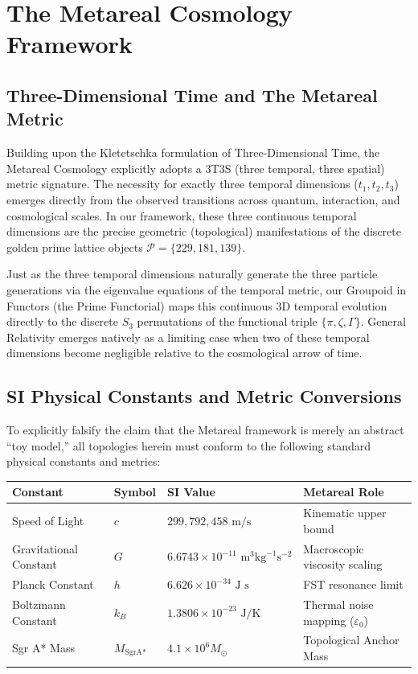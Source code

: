 \section{The Metareal Cosmology Framework}

\subsection*{Three-Dimensional Time and The Metareal Metric}
Building upon the Kletetschka formulation of Three-Dimensional Time, the Metareal Cosmology explicitly adopts a 3T3S (three temporal, three spatial) metric signature. The necessity for exactly three temporal dimensions ($t_1, t_2, t_3$) emerges directly from the observed transitions across quantum, interaction, and cosmological scales. In our framework, these three continuous temporal dimensions are the precise geometric (topological) manifestations of the discrete golden prime lattice objects $\mathcal{P} = \{229, 181, 139\}$. 

Just as the three temporal dimensions naturally generate the three particle generations via the eigenvalue equations of the temporal metric, our Groupoid in Functors (the Prime Functorial) maps this continuous 3D temporal evolution directly to the discrete $S_3$ permutations of the functional triple $\{\pi, \zeta, \Gamma\}$. General Relativity emerges natively as a limiting case when two of these temporal dimensions become negligible relative to the cosmological arrow of time.

\subsection*{SI Physical Constants and Metric Conversions}
To explicitly falsify the claim that the Metareal framework is merely an abstract ``toy model,'' all topologies herein must conform to the following standard physical constants and metrics:
\begin{table}[ht]
\centering
\renewcommand{\arraystretch}{1.2}
\begin{tabular}{@{}llll@{}}
\toprule
\textbf{Constant} & \textbf{Symbol} & \textbf{SI Value} & \textbf{Metareal Role} \\
\midrule
Speed of Light & $c$ & $299,792,458 \text{ m/s}$ & Kinematic upper bound \\
Gravitational Constant & $G$ & $6.6743 \times 10^{-11} \text{ m}^3 \text{kg}^{-1} \text{s}^{-2}$ & Macroscopic viscosity scaling \\
Planck Constant & $h$ & $6.626 \times 10^{-34} \text{ J s}$ & FST resonance limit \\
Boltzmann Constant & $k_B$ & $1.3806 \times 10^{-23} \text{ J/K}$ & Thermal noise mapping ($\varepsilon_0$) \\
Sgr A* Mass & $M_{\text{SgrA*}}$ & $4.1 \times 10^6 M_\odot$ & Topological Anchor Mass \\
\bottomrule
\end{tabular}
\end{table}


